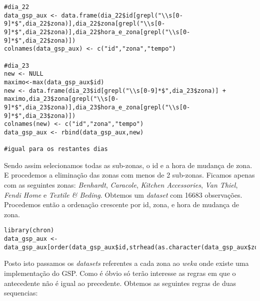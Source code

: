\documentclass[a4paper]{article}
\begin{document}
\begin{lstlisting}
#dia_22
data_gsp_aux <- data.frame(dia_22$id[grepl("\\s[0-9]*$",dia_22$zona)],dia_22$zona[grepl("\\s[0-9]*$",dia_22$zona)],dia_22$hora_e_zona[grepl("\\s[0-9]*$",dia_22$zona)])
colnames(data_gsp_aux) <- c("id","zona","tempo")

#dia_23
new <- NULL
maximo<-max(data_gsp_aux$id)
new <- data.frame(dia_23$id[grepl("\\s[0-9]*$",dia_23$zona)] + maximo,dia_23$zona[grepl("\\s[0-9]*$",dia_23$zona)],dia_23$hora_e_zona[grepl("\\s[0-9]*$",dia_23$zona)])
colnames(new) <- c("id","zona","tempo")
data_gsp_aux <- rbind(data_gsp_aux,new)

#igual para os restantes dias
\end{lstlisting}

Sendo assim selecionamos todas as sub-zonas, o id e a hora de mudança de zona. E procedemos a eliminação das zonas com menos de 2 sub-zonas. Ficamos apenas com as seguintes zonas: \textit{Benhardt}, \textit{Caracole}, \textit{Kitchen Accessories}, \textit{Van Thiel}, \textit{Fendi Home} e \textit{Textile \& Beding}. Obtemos um \textit{dataset } com 16683 observações. Procedemos então a ordenação crescente por id, zona, e hora de mudança de zona.
\begin{lstlisting}
library(chron)
data_gsp_aux <- data_gsp_aux[order(data_gsp_aux$id,strhead(as.character(data_gsp_aux$zona),-1),60*24*as.numeric(times(data_gsp_aux$tempo)),decreasing=F),]
\end{lstlisting}

Posto isto passamos os \textit{datasets} referentes a cada zona ao \textit{weka} onde existe uma implementação do GSP. %
Como é óbvio só terão interesse as regras em que o antecedente não é igual ao precedente. Obtemos as seguintes regras de duas sequencias:
\end{document}
